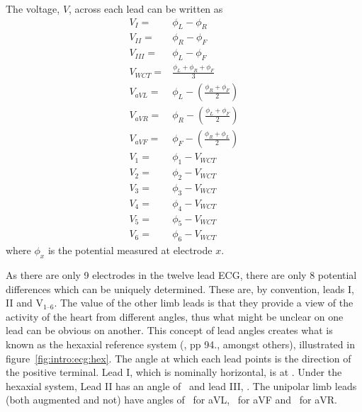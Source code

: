 The voltage, $V$, across each lead can be written as
\begin{subequations} \label{eqn:intro:leads}
\begin{align}
V_{I}  = &\phi_{L} - \phi_{R}\label{eqn:intro:leads:i}\\
V_{II}  = &\phi_{R} - \phi_{F}\label{eqn:intro:leads:ii} \\
V_{III}  = &\phi_{L} - \phi_{F}\label{eqn:intro:leads:iii}\\
V_{WCT}  = &\frac{\phi_{L} + \phi_{R} + \phi_{F}}{3}\label{eqn:intro:leads:wct}\\
V_{aVL} = &\phi_{L} - \left(\frac{\phi_{R} + \phi_{F}}{2}\right) \label{eqn:intro:leads:avl}\\
V_{aVR} = &\phi_{R} - \left(\frac{\phi_{L} + \phi_{F}}{2}\right)\label{eqn:intro:leads:avr} \\
V_{aVF} = & \phi_{F} - \left(\frac{\phi_{R} + \phi_{L}}{2}\right)\label{eqn:intro:leads:avf}\\
V_{1} = & \phi_1 - V_{WCT} \label{eqn:intro:leads:v1}\\
V_{2} = & \phi_2 - V_{WCT} \label{eqn:intro:leads:v2}\\
V_{3} = & \phi_3 - V_{WCT} \label{eqn:intro:leads:v3}\\
V_{4} = & \phi_4 - V_{WCT} \label{eqn:intro:leads:v4}\\
V_{5} = & \phi_5 - V_{WCT} \label{eqn:intro:leads:v5}\\
V_{6} = & \phi_6 - V_{WCT} \label{eqn:intro:leads:v6}
\end{align}
\end{subequations}
where $\phi_x$ is the potential measured at electrode $x$.

As there are only 9 electrodes in the twelve lead ECG, there are only 8
potential differences which can be uniquely determined.
These are, by convention, leads I, II and $\text{V}_{\text{1--6}}$.
The value of the other limb leads is that they provide a view of the activity of
the heart from different angles, thus what might be unclear on one lead can be
obvious on another.
This concept of lead angles creates what is known as the hexaxial reference
system (\cite{Lipman1994}, pp 94., amongst others), illustrated in
figure~\ref{fig:intro:ecg:hex}.
The angle at which each lead points is the direction of the positive terminal.
Lead I, which is nominally horizontal, is at .
Under the hexaxial system, Lead II has an angle of \ and lead III,
.
The unipolar limb leads (both augmented and not) have angles of \ for
aVL, \ for aVF and \ for aVR.

